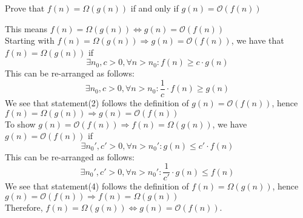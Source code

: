 Prove that $f(n) = \Omega(g(n))$ if and only if $g(n) = \mathcal{O}(f(n))$

\begin{customsolutionbox}
    This means $f(n) = \Omega(g(n)) \iff g(n) = \mathcal{O}(f(n))$ \\
    
    Starting with $f(n) = \Omega(g(n)) \Rightarrow g(n) = \mathcal{O}(f(n))$, we have that $f(n) = \Omega(g(n))$ if
        \begin{equation}
        \exists n_0, c > 0, \forall n > n_0 : f(n) \geq c \cdot g(n)
        \end{equation}
    This can be re-arranged as follows:
        \begin{equation} 
        \exists n_0, c > 0, \forall n > n_0 : \frac{1}{c} \cdot f(n) \geq g(n)
        \end{equation}
    We see that statement(2) follows the definition of $g(n) = \mathcal{O}(f(n))$, hence $f(n) = \Omega(g(n)) \Rightarrow g(n) = \mathcal{O}(f(n))$ \\
    
    To show $g(n) = \mathcal{O}(f(n)) \Rightarrow f(n) = \Omega(g(n))$, we have $g(n) = \mathcal{O}(f(n))$ if
        \begin{equation}
        \exists n_0', c' > 0, \forall n > n_0' : g(n) \leq c' \cdot f(n)
        \end{equation}
    This can be re-arranged as follows:
        \begin{equation}
        \exists n_0', c' > 0, \forall n > n_0' : \frac{1}{c'} \cdot g(n) \leq f(n)
        \end{equation}
    We see that statement(4) follows the definition of $f(n) = \Omega(g(n))$, hence $g(n) = \mathcal{O}(f(n)) \Rightarrow f(n) = \Omega(g(n))$ \\
    Therefore, $f(n) = \Omega(g(n)) \iff g(n) = \mathcal{O}(f(n))$.
\end{customsolutionbox}
    